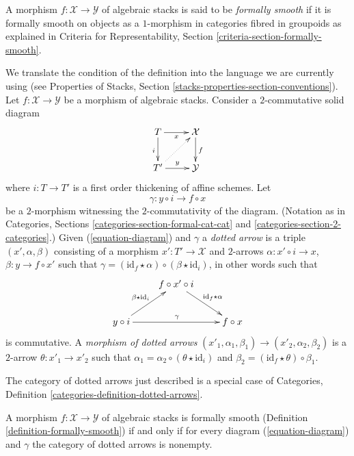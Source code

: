 \begin{definition}
\label{definition-formally-smooth}
A morphism $f : \mathcal{X} \to \mathcal{Y}$ of algebraic stacks is said to be
{\it formally smooth} if it is formally smooth on objects as a
$1$-morphism in categories fibred in groupoids as explained in
Criteria for Representability, Section \ref{criteria-section-formally-smooth}.
\end{definition}

\noindent
We translate the condition of the definition into the language we are currently
using (see
Properties of Stacks, Section \ref{stacks-properties-section-conventions}).
Let $f : \mathcal{X} \to \mathcal{Y}$ be a morphism of algebraic stacks.
Consider a $2$-commutative solid diagram
\begin{equation}
\label{equation-diagram}
\vcenter{
\xymatrix{
T \ar[r]_-x \ar[d]_i & \mathcal{X} \ar[d]^f \\
T' \ar[r]^-y \ar@{..>}[ru] & \mathcal{Y}
}
}
\end{equation}
where $i : T \to T'$ is a first order thickening of affine schemes.
Let
$$
\gamma : y \circ i \longrightarrow f \circ x
$$
be a $2$-morphism witnessing the $2$-commutativity of the diagram.
(Notation as in Categories, Sections \ref{categories-section-formal-cat-cat}
and \ref{categories-section-2-categories}.)
Given (\ref{equation-diagram}) and $\gamma$
a {\it dotted arrow} is a triple $(x', \alpha, \beta)$ consisting of a
morphism $x' : T' \to \mathcal{X}$ and $2$-arrows
$\alpha : x' \circ i \to x$, $\beta : y \to f \circ x'$
such that
$\gamma = (\text{id}_f \star \alpha) \circ (\beta \star \text{id}_i)$,
in other words such that
$$
\xymatrix{
& f \circ x' \circ i \ar[rd]^{\text{id}_f \star \alpha} \\
y \circ i \ar[ru]^{\beta \star \text{id}_i} \ar[rr]^\gamma & &
f \circ x
}
$$
is commutative. A {\it morphism of dotted arrows}
$(x'_1, \alpha_1, \beta_1) \to (x'_2, \alpha_2, \beta_2)$ is a
$2$-arrow $\theta : x'_1 \to x'_2$ such that
$\alpha_1 = \alpha_2 \circ (\theta \star \text{id}_i)$ and
$\beta_2 = (\text{id}_f \star \theta) \circ \beta_1$.

\medskip\noindent
The category of dotted arrows just described is a special case of 
Categories, Definition \ref{categories-definition-dotted-arrows}.

\begin{lemma}
\label{lemma-reformulate-formal-smoothness}
A morphism $f : \mathcal{X} \to \mathcal{Y}$ of algebraic stacks is
formally smooth (Definition \ref{definition-formally-smooth})
if and only if for every diagram (\ref{equation-diagram}) and $\gamma$
the category of dotted arrows is nonempty.
\end{lemma}

